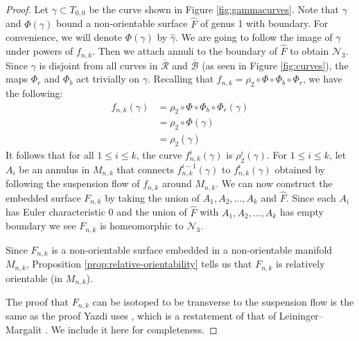 \begin{proof}
  Let $\gamma \subset T_{0,0}$ be the curve shown in Figure \ref{fig:gammacurves}. Note that $\gamma$ and $\Phi(\gamma)$ bound a non-orientable surface
  $\hat{F}$ of genus 1 with boundary. For convenience, we will denote $\Phi(\gamma)$ by $\widehat{\gamma}$. We are going to follow the image of $\gamma$
  under powers of $f_{n,k}$.  Then we attach annuli to the
  boundary of $\widehat{F}$ to obtain $\mathcal{N}_3$. Since $\gamma$ is disjoint from all curves in $\overline{\mathcal{R}}$ and $\overline{\mathcal{B}}$ (as seen in Figure \ref{fig:curves}), the maps $\Phi_r$ and $\Phi_b$ act trivially on $\gamma$.  Recalling that $f_{n,k}=\rho_2\circ\Phi\circ\Phi_b\circ\Phi_r$, we have the following:
  \begin{align*}
    f_{n,k}(\gamma) &= \rho_2 \circ \Phi \circ \Phi_b \circ \Phi_r(\gamma) \\
                    &= \rho_2 \circ \Phi(\gamma) \\
                    &= \rho_2(\widehat{\gamma}) %
  \end{align*}
  It follows that for all $1\leq i\leq k$, the curve $f_{n,k}^i(\gamma)$ is $\rho_2^i(\gamma)$.  
  For $1\leq i\leq k$, let $A_i$ be an annulus in $M_{n,k}$ that connects $f_{n,k}^{i-1}(\gamma)$ to $f_{n,k}^i(\gamma)$ obtained by following the suspension
  flow of $f_{n,k}$ around $M_{n,k}$. We can now construct the embedded surface $F_{n,k}$ by taking the union of
  $A_1,A_2,\dots,A_k$ and $\hat{F}$. Since each $A_i$ has Euler characteristic 0 and the union of $\hat{F}$ with $A_1,A_2,\dots, A_k$ has empty boundary we see $F_{n,k}$ is homeomorphic to $\mathcal{N}_3$.

 Since $F_{n,k}$ is a non-orientable surface embedded in a non-orientable manifold $M_{n,k}$, Proposition \ref{prop:relative-orientability} tells us that $F_{n,k}$ is relatively orientable (in $M_{n,k}$).

  The proof that $F_{n,k}$ can be isotoped to be transverse to the suspension flow is the same as the
  proof Yazdi uses \cite{yazdi2018pseudo}, which is a restatement of that of Leininger--Margalit \cite{leininger2013number}. We include it here for completeness.  
  

\end{proof}
